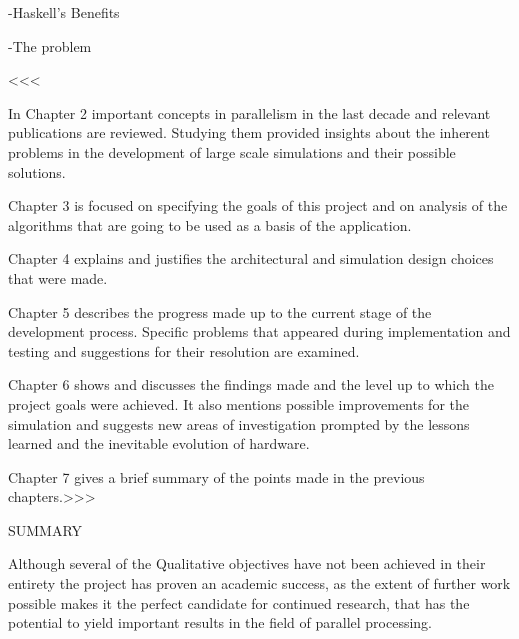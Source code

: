 \documentclass[main.tex]{subfiles}
\begin{document}
-Haskell's Benefits

-The problem





<<<

In Chapter 2 important concepts in parallelism in the last decade and relevant publications are reviewed. Studying them provided insights about the inherent problems in the development of large scale simulations and their possible solutions.



Chapter 3 is focused on specifying the goals of this project and on analysis of the algorithms that are going to be used as a basis of the application.



Chapter 4 explains and justifies the architectural and simulation design choices that were made.



Chapter 5 describes the progress made up to the current stage of the development process. Specific problems that appeared during implementation and testing and suggestions for their resolution are examined.



Chapter 6 shows and discusses the findings made and the level up to which the project goals were achieved. It also mentions possible improvements for the simulation and suggests new areas of investigation prompted by the lessons learned and the inevitable evolution of hardware.



Chapter 7 gives a brief summary of the points made in the previous chapters.>>>







SUMMARY

Although several of the Qualitative objectives have not been achieved in their entirety the project has proven an academic success, as the extent of further work possible makes it the perfect candidate for continued research, that has the potential to yield important results in the field of parallel processing.



\end{document}
